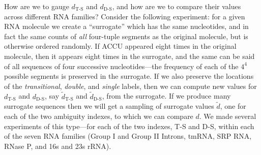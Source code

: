 \documentclass[10pt,letterpaper]{article}
\begin{document}
How are
we to gauge $d_\text{T-S}$ and $d_\text{D-S}$, and how are we to compare their values across different RNA families? 
Consider the following experiment: for a given RNA molecule we create a ``surrogate'' which has the same nucleotides, and in fact the same counts of {\em all} four-tuple segments as the original molecule, but is otherwise ordered randomly. If ACCU appeared eight times in the original molecule, then it appears eight times in the surrogate, and the same can be said of all sequences of four successive nucleotides---the frequency of each of the $4^4$ possible segments is preserved in the surrogate.  If we also preserve the locations of the {\it transitional}, {\it double}, and {\it single} labels, then we can compute new values for $d_\text{T-S}$ and $d_\text{D-S}$,
say  $\tilde{d}_\text{T-S}$ and $\tilde{d}_\text{D-S}$, from the surrogate. If we produce many surrogate sequences then we will get a sampling of  
surrogate values $\tilde{d}$, one for each of the two ambiguity indexes, to which we can compare $d$. We made several experiments of this type---for each of the two indexes, T-S and D-S, within each of the seven RNA families (Group I and Group II Introns, tmRNA, SRP RNA, RNase P, and 16s and 23s rRNA).
\end{document}
